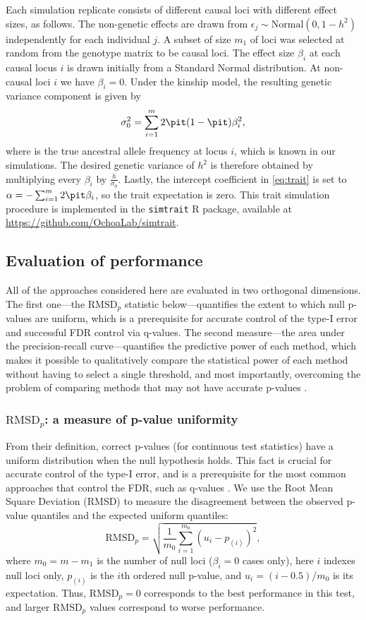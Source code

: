 \documentclass[11pt]{article}
\newcommand{\rmsd}{\text{RMSD}_p}
\begin{document}
Each simulation replicate consists of different causal loci with different effect sizes, as follows.
The non-genetic effects are drawn from $\epsilon_j \sim \text{Normal}(0, 1 - h^2 )$ independently for each individual $j$.
A subset of size $m_1$ of loci was selected at random from the genotype matrix to be causal loci.
The effect size $\beta_i$ at each causal locus $i$ is drawn initially from a Standard Normal distribution.
At non-causal loci $i$ we have $\beta_i = 0$.
Under the kinship model, the resulting genetic variance component is given by
$$
\sigma^2_0
=
\sum_{i = 1}^m 2 \pit ( 1 - \pit ) \beta_i^2 ,
$$
where \pit is the true ancestral allele frequency at locus $i$, which is known in our simulations.
The desired genetic variance of $h^2$ is therefore obtained by multiplying every $\beta_i$ by $\frac{h}{ \sigma_0 }$.
Lastly, the intercept coefficient in \cref{eq:trait} is set to $\alpha = - \sum_{i=1}^m 2 \pit \beta_i$, so the trait expectation is zero.
This trait simulation procedure is implemented in the \texttt{simtrait} R package, available at
\url{https://github.com/OchoaLab/simtrait}.

\subsection{Evaluation of performance}

All of the approaches considered here are evaluated in two orthogonal dimensions.
The first one---the $\rmsd$ statistic below---quantifies the extent to which null p-values are uniform, which is a prerequisite for accurate control of the type-I error and successful FDR control via q-values.
The second measure---the area under the precision-recall curve---quantifies the predictive power of each method, which makes it possible to qualitatively compare the statistical power of each method without having to select a single threshold, and most importantly, overcoming the problem of comparing methods that may not have accurate p-values \citep{bouaziz_accounting_2011}.

\subsubsection{$\rmsd$: a measure of p-value uniformity}

From their definition, correct p-values (for continuous test statistics) have a uniform distribution when the null hypothesis holds.
This fact is crucial for accurate control of the type-I error, and is a prerequisite for the most common approaches that control the FDR, such as q-values \citep{storey_positive_2003, storey_statistical_2003}.
We use the Root Mean Square Deviation (RMSD) to measure the disagreement between the observed p-value quantiles and the expected uniform quantiles:
$$
\rmsd
=
\sqrt{ \frac{1}{m_0} \sum_{i = 1}^{m_0} \left( u_i - p_{(i)} \right)^2 },
$$
where
$m_0 = m - m_1$ is the number of null loci ($\beta_i = 0$ cases only),
here $i$ indexes null loci only,
$p_{(i)}$ is the $i$th ordered null p-value, and
$u_i = ( i - 0.5 ) / m_0$ is its expectation.
Thus, $\rmsd = 0$ corresponds to the best performance in this test, and larger $\rmsd$ values correspond to worse performance.
\end{document}
